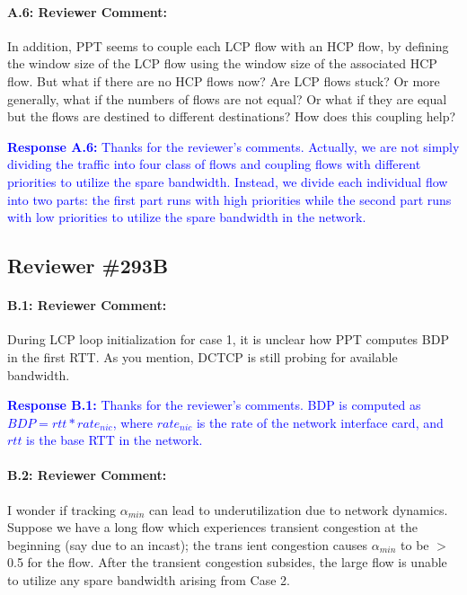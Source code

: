\documentclass[12pt,one-column]{article}
\begin{document}
{\it \paragraph{A.6: Reviewer Comment:} In addition, PPT seems to couple each LCP flow with an HCP flow, by defining the window size of the LCP flow using the window size of the associated HCP flow. But what if there are no HCP flows now? Are LCP flows stuck? Or more generally, what if the numbers of flows are not equal? Or what if they are equal but the flows are destined to different destinations? How does this coupling help? }	

\noindent\textcolor{blue}{\textbf{Response A.6:} Thanks for the reviewer's comments. Actually, we are not simply dividing the traffic into four class of flows and coupling flows with different priorities to utilize the spare bandwidth. Instead, we divide each individual flow into two parts: the first part runs with high priorities while the second part runs with low priorities to utilize the spare bandwidth in the network.}


\subsection{Reviewer \#293B}
{\it \paragraph{B.1: Reviewer Comment:} During LCP loop initialization for case 1, it is unclear how PPT computes BDP in the first RTT. As you mention, DCTCP is still probing for available bandwidth.}

\noindent\textcolor{blue}{\textbf{Response B.1:}
Thanks for the reviewer's comments. 
BDP is computed as $BDP = rtt*rate_{nic}$, where $rate_{nic}$ is the rate of the network interface card, and $rtt$ is the base RTT in the network.
}

{\it \paragraph{B.2: Reviewer Comment:} I wonder if tracking $\alpha_{min}$ can lead to underutilization due to network dynamics. Suppose we have a long flow which experiences transient congestion at the beginning (say due to an incast); the trans ient congestion causes $\alpha_{min}$ to be $>$ 0.5 for the flow. After the transient congestion subsides, the large flow is unable to utilize any spare bandwidth arising from Case 2.}
\end{document}
